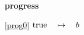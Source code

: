 \textbf{progress}
\begin{block}
\item[ \eqref{prog0} ]{$\text{true}  \quad \mapsto\quad b$} %
\end{block}
